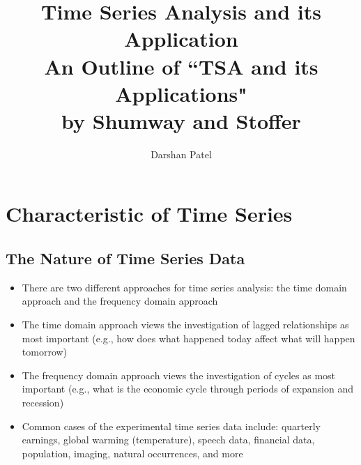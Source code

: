 \documentclass[12pt]{article}
\begin{document}
\title{Time Series Analysis and its Application \\ \Large An Outline of ``TSA and its Applications" \\ by Shumway and Stoffer}
\author{Darshan Patel}
\maketitle

\tableofcontents 

\newpage
\section{Characteristic of Time Series}
\subsection{The Nature of Time Series Data}
\begin{itemize}
\item There are two different approaches for time series analysis: the time domain approach and the frequency domain approach
\item The time domain approach views the investigation of lagged relationships as most important (e.g., how does what happened today affect what will happen tomorrow)
\item The frequency domain approach views the investigation of cycles as most important (e.g., what is the economic cycle through periods of expansion and recession)
\item Common cases of the experimental time series data include: quarterly earnings, global warming (temperature), speech data, financial data, population, imaging, natural occurrences, and more
\end{itemize}
\end{document}
